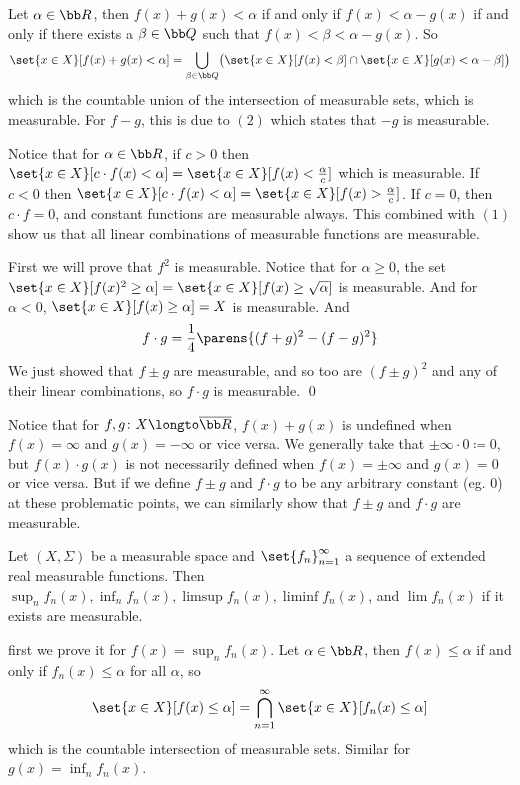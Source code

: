 \benum
    \item Let $\alpha\in{\bb R}$, then $f(x)+g(x)<\alpha$ if and only if $f(x)<\alpha-g(x)$ if and only if there exists a $\beta\in{\bb Q}$ such that $f(x)<\beta<\alpha-g(x)$.
        So
        $$ \set{x\in X}[f(x)+g(x)<\alpha] = \bigcup_{\beta\in{\bb Q}}\bigl(\set{x\in X}[f(x)<\beta]\cap\set{x\in X}[g(x)<\alpha-\beta]\bigr) $$
        which is the countable union of the intersection of measurable sets, which is measurable.
        For $f-g$, this is due to $(2)$ which states that $-g$ is measurable.
    \item Notice that for $\alpha\in{\bb R}$, if $c>0$ then $\set{x\in X}[c\cdot f(x)<\alpha]=\set{x\in X}[f(x)<\frac\alpha c]$ which is measurable.
        If $c<0$ then $\set{x\in X}[c\cdot f(x)<\alpha]=\set{x\in X}[f(x)>\frac\alpha c]$.
        If $c=0$, then $c\cdot f=0$, and constant functions are measurable always.
        This combined with $(1)$ show us that all linear combinations of measurable functions are measurable.
    \item First we will prove that $f^2$ is measurable.
        Notice that for $\alpha\geq0$, the set $\set{x\in X}[f(x)^2\geq\alpha]=\set{x\in X}[f(x)\geq\sqrt\alpha]$ is measurable.
        And for $\alpha<0$, $\set{x\in X}[f(x)\geq\alpha]=X$ is measurable.
        And
        $$ f\cdot g = \frac14\parens{(f+g)^2 - (f-g)^2} $$
        We just showed that $f\pm g$ are measurable, and so too are $(f\pm g)^2$ and any of their linear combinations, so $f\cdot g$ is measurable.
        \qed
\eenum

Notice that for $f,g\colon X\longto\overline{\bb R}$, $f(x)+g(x)$ is undefined when $f(x)=\infty$ and $g(x)=-\infty$ or vice versa.
We generally take that $\pm\infty\cdot0\coloneqq0$, but $f(x)\cdot g(x)$ is not necessarily defined when $f(x)=\pm\infty$ and $g(x)=0$ or vice versa.
But if we define $f\pm g$ and $f\cdot g$ to be any arbitrary constant (eg. $0$) at these problematic points, we can similarly show that $f\pm g$ and $f\cdot g$ are measurable.

\bthrm

    Let $(X,\Sigma)$ be a measurable space and $\set{f_n}_{n=1}^\infty$ a sequence of extended real measurable functions.
    Then $\sup_nf_n(x),\inf_nf_n(x),\limsup f_n(x),\liminf f_n(x)$, and $\lim f_n(x)$ if it exists are measurable.

\ethrm

\Proof first we prove it for $f(x)=\sup_nf_n(x)$.
Let $\alpha\in{\bb R}$, then $f(x)\leq\alpha$ if and only if $f_n(x)\leq\alpha$ for all $\alpha$, so
$$ \set{x\in X}[f(x)\leq\alpha] = \bigcap_{n=1}^\infty\set{x\in X}[f_n(x)\leq\alpha] $$
which is the countable intersection of measurable sets.
Similar for $g(x)=\inf_nf_n(x)$.

